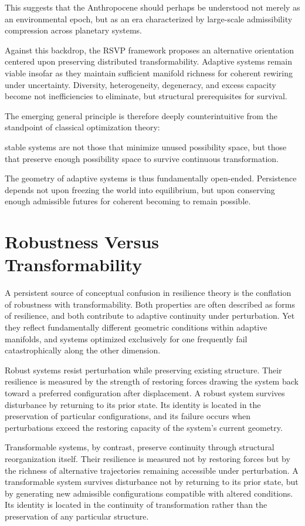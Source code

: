 \documentclass[11pt,a4paper]{article}
\begin{document}
This suggests that the Anthropocene should perhaps be understood not merely as an environmental epoch, but as an era characterized by large-scale admissibility compression across planetary systems.

Against this backdrop, the RSVP framework proposes an alternative orientation centered upon preserving distributed transformability. Adaptive systems remain viable insofar as they maintain sufficient manifold richness for coherent rewiring under uncertainty. Diversity, heterogeneity, degeneracy, and excess capacity become not inefficiencies to eliminate, but structural prerequisites for survival.

The emerging general principle is therefore deeply counterintuitive from the standpoint of classical optimization theory:

stable systems are not those that minimize unused possibility space, but those that preserve enough possibility space to survive continuous transformation.

The geometry of adaptive systems is thus fundamentally open-ended. Persistence depends not upon freezing the world into equilibrium, but upon conserving enough admissible futures for coherent becoming to remain possible.

\newpage

\section{Robustness Versus Transformability}

A persistent source of conceptual confusion in resilience theory is the conflation of robustness with transformability. Both properties are often described as forms of resilience, and both contribute to adaptive continuity under perturbation. Yet they reflect fundamentally different geometric conditions within adaptive manifolds, and systems optimized exclusively for one frequently fail catastrophically along the other dimension.

Robust systems resist perturbation while preserving existing structure. Their resilience is measured by the strength of restoring forces drawing the system back toward a preferred configuration after displacement. A robust system survives disturbance by returning to its prior state. Its identity is located in the preservation of particular configurations, and its failure occurs when perturbations exceed the restoring capacity of the system's current geometry.

Transformable systems, by contrast, preserve continuity through structural reorganization itself. Their resilience is measured not by restoring forces but by the richness of alternative trajectories remaining accessible under perturbation. A transformable system survives disturbance not by returning to its prior state, but by generating new admissible configurations compatible with altered conditions. Its identity is located in the continuity of transformation rather than the preservation of any particular structure.
\end{document}
